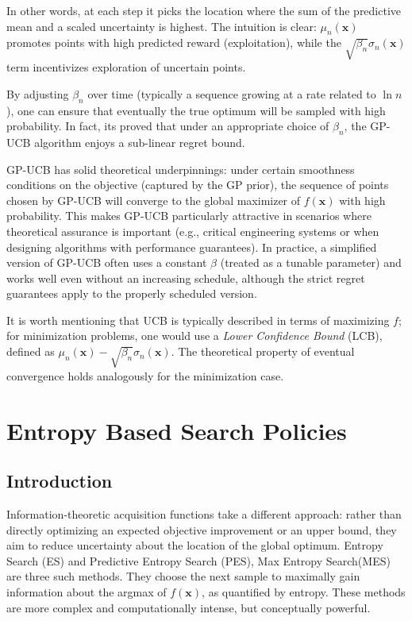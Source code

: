 \documentclass{ut-thesis}
\begin{document}
In other words, at each step it picks the location where the sum of the predictive mean and a scaled uncertainty is highest. The intuition is clear: $\mu_n(\mathbf{x})$ promotes points with high predicted reward (exploitation), while the $\sqrt{\beta_n}\sigma_n(\mathbf{x})$ term incentivizes exploration of uncertain points. 

By adjusting $\beta_n$ over time (typically a sequence growing at a rate related to $\ln n$), one can ensure that eventually the true optimum will be sampled with high probability. In fact, its proved that under an appropriate choice of $\beta_n$, the GP-UCB algorithm enjoys a sub-linear regret bound\cite{10.5555/3104322.3104451}.

GP-UCB has solid theoretical underpinnings: under certain smoothness conditions on the objective (captured by the GP prior), the sequence of points chosen by GP-UCB will converge to the global maximizer of $f(\mathbf{x})$ with high probability. This makes GP-UCB particularly attractive in scenarios where theoretical assurance is important (e.g., critical engineering systems or when designing algorithms with performance guarantees). In practice, a simplified version of GP-UCB often uses a constant $\beta$ (treated as a tunable parameter) and works well even without an increasing schedule, although the strict regret guarantees apply to the properly scheduled version. 

It is worth mentioning that UCB is typically described in terms of maximizing $f$; for minimization problems, one would use a \emph{Lower Confidence Bound} (LCB), defined as $\mu_n(\mathbf{x}) - \sqrt{\beta_n}\sigma_n(\mathbf{x})$. The theoretical property of eventual convergence holds analogously for the minimization case.



\chapter{Entropy Based Search Policies}

\section{Introduction}

Information-theoretic acquisition functions take a different approach: rather than directly optimizing an expected objective improvement or an upper bound, they aim to reduce uncertainty about the location of the global optimum. Entropy Search (ES) and Predictive Entropy Search (PES), Max Entropy Search(MES) are three such methods. They choose the next sample to maximally gain information about the argmax of $f(\mathbf{x})$, as quantified by entropy. These methods are more complex and computationally intense, but conceptually powerful.
\end{document}
